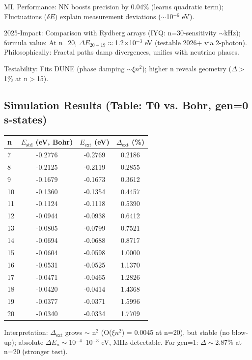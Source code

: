 	ML Performance: NN boosts precision by 0.04\% (learns quadratic term); Fluctuations ($\delta E$) explain measurement deviations ($\sim$10$^{-6}$ eV).
	
	2025-Impact: Comparison with Rydberg arrays (IYQ: n=30-sensitivity $\sim$kHz); formula value: At n=20, $\Delta E_{20-19} \approx$1.2$\times$10$^{-3}$ eV (testable 2026+ via 2-photon). Philosophically: Fractal paths damp divergences, unifies with neutrino phases.
	
	Testability: Fits DUNE (phase damping $\sim\xi n^2$); higher n reveals geometry ($\Delta>$1\% at n$>$15).
	
	\subsection{Simulation Results (Table: T0 vs. Bohr, gen=0 s-states)}
	
	\begin{table}[ht]
		\centering
\begin{tabular}{lccc}
			\toprule
			n & $E_\text{std}$ (eV, Bohr) & $E_\text{ext}$ (eV) & $\Delta_\text{ext}$ (\%) \\
			\midrule
			7 & -0.2776 & -0.2769 & 0.2186 \\
			8 & -0.2125 & -0.2119 & 0.2855 \\
			9 & -0.1679 & -0.1673 & 0.3612 \\
			10 & -0.1360 & -0.1354 & 0.4457 \\
			11 & -0.1124 & -0.1118 & 0.5390 \\
			12 & -0.0944 & -0.0938 & 0.6412 \\
			13 & -0.0805 & -0.0799 & 0.7521 \\
			14 & -0.0694 & -0.0688 & 0.8717 \\
			15 & -0.0604 & -0.0598 & 1.0000 \\
			16 & -0.0531 & -0.0525 & 1.1370 \\
			17 & -0.0471 & -0.0465 & 1.2826 \\
			18 & -0.0420 & -0.0414 & 1.4368 \\
			19 & -0.0377 & -0.0371 & 1.5996 \\
			20 & -0.0340 & -0.0334 & 1.7709 \\
			\bottomrule
		\end{tabular}

	\end{table}
	
	Interpretation: $\Delta_\text{ext}$ grows $\sim$ n$^2$ (O($\xi n^2$) = 0.0045 at n=20), but stable (no blow-up); absolute $\Delta E_n \sim$10$^{-4}$–10$^{-3}$ eV, MHz-detectable. For gen=1: $\Delta\sim$2.87\% at n=20 (stronger test).
	
